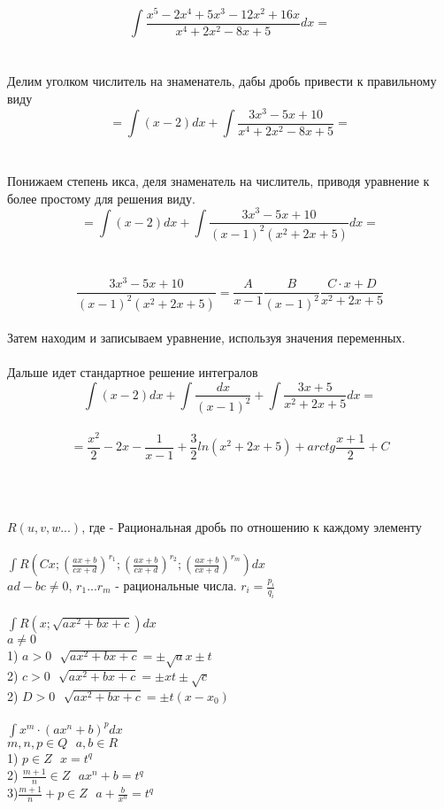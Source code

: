 \begin{center}
  \\
\end{center}

\[\int \frac{x^5 - 2x^4 + 5x^3 - 12x^2 + 16x}{x^4 + 2x^2 - 8x + 5} dx = \]\\
\\
Делим уголком числитель на знаменатель, дабы дробь привести к правильному виду\\
\[= \int (x - 2)dx + \int \frac{3x^3 - 5x + 10}{x^4 + 2x^2 - 8x + 5} = \]\\
\\
Понижаем степень икса, деля знаменатель на числитель, приводя уравнение к более
простому для решения виду.\\
\[= \int (x - 2)dx + \int \frac{3x^3 - 5x + 10}{(x-1)^2 (x^2+2x+5)} dx = \]\\
\\
\[\frac{3x^3 - 5x + 10}{(x-1)^2 (x^2+2x+5)} = \frac{A}{x - 1} \frac{B}{(x - 1)^2}
\frac{C \cdot x + D}{x^2 + 2x + 5}\]\\
Затем находим  и записываем уравнение, используя значения
переменных.\\
\\
Дальше идет стандартное решение интегралов
\[\int (x - 2)dx + \int \frac{dx}{(x - 1)^2} + \int \frac{3x + 5}{x^2 + 2x + 5}
dx =\]\\ 
\[= \frac{x^2}{2} - 2x - \frac{1}{x-1} + \frac{3}{2} ln(x^2 + 2x + 5) + arctg
\frac{x + 1}{2} + C\]\\

\begin{center}
  \\
\end{center}

$R(u, v, w ...)$, где  - Рациональная дробь по отношению к каждому
элементу\\

\\
$\int R \left ( Cx; \left ( \frac{ax + b}{cx + d} \right )^{r_{1}};
\left ( \frac{ax + b}{cx + d} \right )^{r_{2}};
\left ( \frac{ax + b}{cx + d} \right )^{r_{m}} \right )dx$\\
$ad - bc \neq 0$, $r_{1}...r_{m}$ - рациональные числа.
$r_{i} = \frac{p_{i}}{q_{i}}$\\

\\
$\int R \left (x; \sqrt{ax^2 + bx + c} \right )dx$\\
$a \neq 0$\\
1) $a > 0 ~~~ \sqrt{ax^2 + bx + c} = \pm \sqrt{a}x \pm t$\\
2) $c > 0 ~~~ \sqrt{ax^2 + bx + c} = \pm xt \pm \sqrt{c}$\\
2) $D > 0 ~~~ \sqrt{ax^2 + bx + c} = \pm t (x - x_{0})$\\

\\
$\int x^m \cdot (ax^n + b)^p dx$\\
$m, n, p \in Q ~~~ a, b \in R$\\
1) $p \in Z ~~~ x = t^q$\\
2) $\frac{m+1}{n} \in Z ~~~ ax^n + b = t^q$\\
3)$\frac{m+1}{n} + p \in Z ~~~ a + \frac{b}{x^n} = t^q$\\
 
